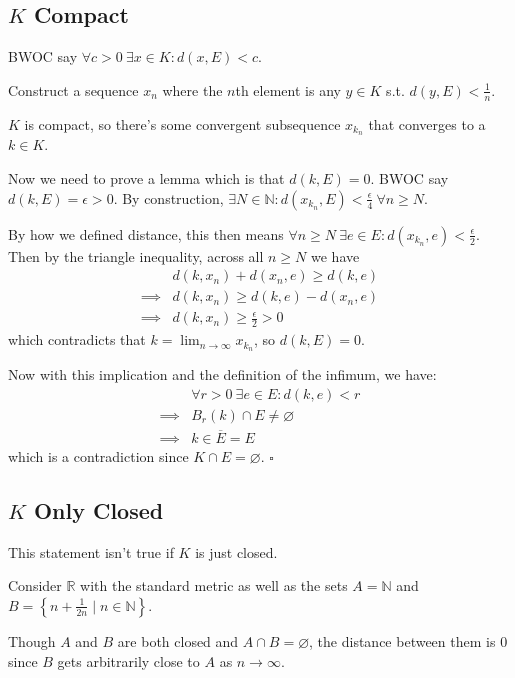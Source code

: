 \documentclass[12pt]{article}
\newcommand{\N}{\mathbb{N}}
\newcommand{\R}{\mathbb{R}}
\begin{document}
\subsection{\texorpdfstring{$K$}{K} Compact}

BWOC say $\forall c > 0\ \exists x \in K: d(x, E) < c$.

Construct a sequence $x_n$ where the $n$th element is any $y \in K$ s.t. $d(y, E) < \frac{1}{n}$.

$K$ is compact, so there's some convergent subsequence $x_{k_n}$ that converges to a $k \in K$.

Now we need to prove a lemma which is that $d(k, E)=0$.
BWOC say $d(k, E)=\epsilon > 0$.
By construction, $\exists N \in \N: d(x_{k_n}, E) < \frac{\epsilon}{4}\ \forall n \ge N$.

By how we defined distance, this then means $\forall n \ge N\ \exists e \in E: d(x_{k_n}, e) < \frac{\epsilon}{2}$.
Then by the triangle inequality, across all $n \ge N$ we have
\begin{align*}
  & d(k, x_n) + d(x_n, e) \ge d(k, e) \\
  \implies{} & d(k, x_n) \ge d(k, e) - d(x_n, e) \\
  \implies{} & d(k, x_n) \ge \frac{\epsilon}{2} > 0
\end{align*}
which contradicts that $k=\lim_{n \to \infty} x_{k_n}$, so $d(k, E)=0$.

Now with this implication and the definition of the infimum, we have:
\begin{align*}
             & \forall r > 0\ \exists e \in E: d(k, e) < r \\
  \implies{} & B_r(k) \cap E \ne \varnothing               \\
  \implies{} & k \in \overline{E}=E
\end{align*}
which is a contradiction since $K \cap E = \varnothing$. $\square$

\subsection{\texorpdfstring{$K$}{K} Only Closed}

This statement isn't true if $K$ is just closed.

Consider $\R$ with the standard metric as well as the sets $A=\N$ and $B=\left\{n+\frac{1}{2n} \mid n \in \N\right\}$.

Though $A$ and $B$ are both closed and $A \cap B = \varnothing$, the distance
between them is $0$ since $B$ gets arbitrarily close to $A$ as $n \to \infty$.
\end{document}
